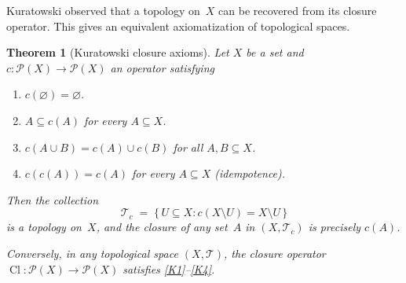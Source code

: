 \documentclass[11pt,a4paper,twoside]{book}
\newtheorem{theorem}{Theorem}[section]
\theoremstyle{remark}
\theoremstyle{definition}
\theoremstyle{definition}
\newcommand{\Tau}{\mathcal{T}}           %
\newcommand{\Pow}{\mathcal{P}}           %
\DeclareMathOperator{\Cl}{Cl}
\begin{document}
Kuratowski observed that a topology on~$X$ can be recovered from its closure
operator.  This gives an equivalent axiomatization of topological spaces.

\begin{theorem}[Kuratowski closure axioms]
\label{thm:kuratowski-axioms}
Let $X$ be a set and $c\colon\Pow(X)\to\Pow(X)$ an operator satisfying
\begin{enumerate}[label=\textup{(K\arabic*)}]
  \item\label{K1} $c(\varnothing)=\varnothing$.
  \item\label{K2} $A\subseteq c(A)$ for every $A\subseteq X$.
  \item\label{K3} $c(A\cup B)=c(A)\cup c(B)$ for all $A,B\subseteq X$.
  \item\label{K4} $c(c(A))=c(A)$ for every $A\subseteq X$ \textup{(}idempotence\textup{)}.
\end{enumerate}
Then the collection
\[
  \Tau_c \;=\; \{\, U\subseteq X : c(X\setminus U)=X\setminus U\,\}
\]
is a topology on~$X$, and the closure of any set~$A$ in $(X,\Tau_c)$ is
precisely $c(A)$.

Conversely, in any topological space $(X,\Tau)$, the closure operator
$\Cl\colon\Pow(X)\to\Pow(X)$ satisfies \textup{\ref{K1}--\ref{K4}}.
\end{theorem}
\end{document}
